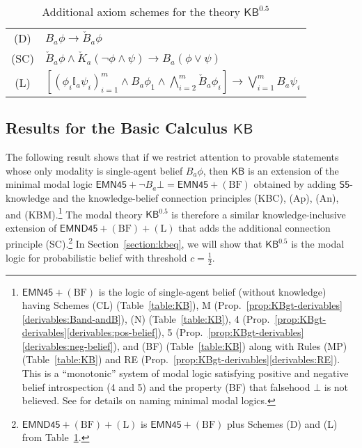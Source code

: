 \documentclass[12pt]{article}
\newcommand{\XXXcomment}[1]{}
\newcommand{\XXXcomment}[1]{\marginpar{\color{blue}{\footnotesize #1}}}
\theoremstyle{definition}
\newcommand{\KB}{{\mathsf{KB}}}                        %
\newcommand{\KBeq}{{\mathsf{KB}^{\mathsf{0.5}}}}       %
\begin{document}
\begin{table}[ht]
  \begin{center}
    \renewcommand{\arraystretch}{1.3}
    \begin{tabular}[t]{cl}
      (D) &
      $B_a\phi\to \check B_a\phi$
      \\
      (SC) &
      $\check B_a\phi \land 
      \check K_a(\lnot\phi\land\psi) \to 
      B_a(\phi\lor\psi)$
      \\
      (L) &
      $\textstyle [(\phi_i\mathbb{I}_a\psi_i)_{i=1}^m
      \land B_a\phi_1 \land \bigwedge_{i=2}^m \check B_a\phi_i] \to
      \bigvee_{i=1}^m B_a\psi_i$
    \end{tabular}
  \end{center}
  \caption{Additional axiom schemes for the theory $\KBeq$}
  \label{table:additional-schemes}
\end{table}

\subsection{Results for the Basic Calculus \texorpdfstring{$\KB$}{KB}}

\XXXcomment{BR: added initial text before the proposition and text
  after each item in Prop.~\ref{prop:KBgt-derivables} to provide a
  clear statement (and explanations) of the neighborhood modal logic
  we extend.}

The following result shows that if we restrict attention to provable
statements whose only modality is single-agent belief $B_a\phi$, then
$\KB$ is an extension of the minimal modal logic $\mathsf{EMN45}+\lnot
B_a\bot=\mathsf{EMN45}+(\text{BF})$ obtained by adding
$\mathsf{S5}$-knowledge and the knowledge-belief connection principles
(KBC), (Ap), (An), and (KBM).\footnote{$\mathsf{EMN45}+(\text{BF})$ is
  the logic of single-agent belief (without knowledge) having Schemes
  (CL) (Table~\ref{table:KB}), M
  (Prop.~\ref{prop:KBgt-derivables}\eqref{derivables:Band-andB}), (N)
  (Table~\ref{table:KB}), 4
  (Prop.~\ref{prop:KBgt-derivables}\eqref{derivables:pos-belief}), 5
  (Prop.~\ref{prop:KBgt-derivables}\eqref{derivables:neg-belief}), and
  (BF) (Table~\ref{table:KB}) along with Rules (MP)
  (Table~\ref{table:KB}) and RE
  (Prop.~\ref{prop:KBgt-derivables}\eqref{derivables:RE}). This is a
  ``monotonic'' system of modal logic satisfying positive and negative
  belief introspection (4 and 5) and the property (BF) that falsehood
  $\bot$ is not believed. See \cite[Ch.~8]{Chellas:ml} for details on
  naming minimal modal logics.} The modal theory $\KBeq$ is therefore
a similar knowledge-inclusive extension of
$\mathsf{EMND45}+(\text{BF})+(\text{L})$ that adds the additional
connection principle
(SC).\footnote{$\mathsf{EMND45}+(\text{BF})+(\text{L})$ is
  $\mathsf{EMN45}+(\text{BF})$ plus Schemes (D) and (L) from
  Table~\ref{table:additional-schemes}.}  In
Section~\ref{section:kbeq}, we will show that $\KBeq$ is the modal
logic for probabilistic belief with threshold $c=\frac 12$.
\end{document}
